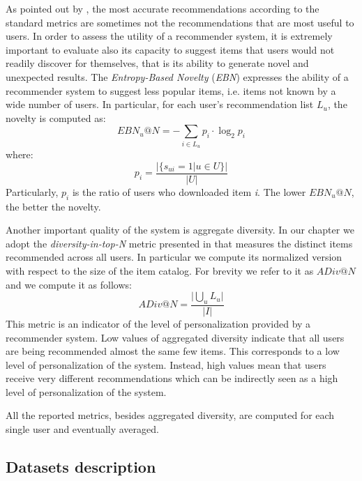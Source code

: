As pointed out by \cite{McNee2006}, the most accurate recommendations according to the standard metrics are sometimes not the recommendations that are most useful to users. In order to assess the utility of a recommender system, it is extremely important to evaluate also its capacity to suggest items that users would not readily discover for themselves, that is its ability to generate novel and unexpected results.
The \textit{Entropy-Based Novelty} (\textit{EBN}) \citep{Bellogin2010} expresses the ability of a recommender system to suggest less popular items, i.e. items not known by a wide number of users. 
In particular, for each user's recommendation list $L_u$, the novelty is computed as:  
\[ EBN_u@N = - \sum \limits_{ i\in L_u} p_i \cdot \log_{2} p_i \]
where:
\[    p_i = \frac{ \vert \lbrace s_{ui}=1 \vert u \in U \rbrace \vert}{  \vert  U  \vert } \]
\noindent Particularly, $p_i$ is the ratio of users who downloaded item \textit{i}. The lower $EBN_u@N$, the better the novelty.

Another important quality of the system is aggregate diversity. 
In our chapter we adopt the \textit{diversity-in-top-N} metric presented in \cite{adomavicius2012improving} that measures the distinct items recommended across all users. In particular we compute its normalized version with respect to the size of the item catalog. For brevity we refer to it as $ADiv@N$ and we compute it as follows:
\[ ADiv@N = \frac{ \vert \bigcup_u L_u \vert }{ \vert I \vert }  \]
This metric is an indicator of the level of personalization provided by a recommender system. Low values of aggregated diversity indicate  that all users are being recommended almost the same few items. This corresponds to a low level of personalization of the system. Instead, high values mean that users receive very different recommendations which can be indirectly seen as a high level of personalization of the system. %

All the reported metrics, besides aggregated diversity, are computed for each single user and eventually averaged.

\subsection{Datasets description}
\label{sec:graph-rec:datasets}

